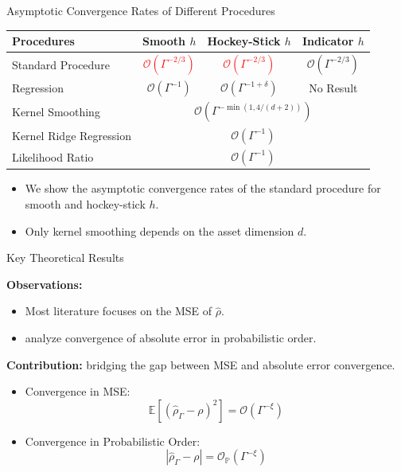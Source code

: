 \documentclass[9pt,handout]{beamer}
\begin{document}
\begin{frame}{Asymptotic Convergence Rates of Different Procedures}

    \begin{table}
		\centering
		\begin{tabular}{l|c|c|c}
			\toprule
			\textbf{Procedures} & \textbf{Smooth $h$} & \textbf{Hockey-Stick $h$} & \textbf{Indicator $h$}  \\
			\midrule
			Standard Procedure	& \textcolor{red}{$\mathcal{O}(\Gamma^{-2/3})$} & \textcolor{red}{$\mathcal{O}(\Gamma^{-2/3})$} & $\mathcal{O}(\Gamma^{-2/3})$ \\
			\midrule
			Regression  & $\mathcal{O}(\Gamma^{-1})$ & $\mathcal{O}(\Gamma^{-1+\delta})$ & No Result \\
			\midrule
			Kernel Smoothing 	& \multicolumn{3}{c}{$\mathcal{O}(\Gamma^{-\min(1, 4/(d+2))})$}  \\
			\midrule
			Kernel Ridge Regression  		& \multicolumn{3}{c}{$\mathcal{O}(\Gamma^{-1})$} \\
			\midrule
			Likelihood Ratio  			& \multicolumn{3}{c}{$\mathcal{O}(\Gamma^{-1})$} \\
			\bottomrule
		\end{tabular}
	\end{table}
    \vspace{10pt}
    \begin{itemize}
        \item We show the asymptotic convergence rates of the standard procedure for smooth and hockey-stick $h$.
        \item Only kernel smoothing depends on the asset dimension $d$.
    \end{itemize}

\note{}
    
\end{frame}

\begin{frame}{Key Theoretical Results}

\textbf{Observations:}
\begin{itemize}
\item Most literature focuses on the MSE of $\hat{\rho}$.
\item \citet{wang2022smooth} analyze convergence of absolute error in probabilistic order.
\end{itemize}

\vspace{10pt}

\textbf{Contribution:} bridging the gap between MSE and absolute error convergence.
\begin{itemize}
    \item Convergence in MSE:
    $$ \mathbb{E} \left[ \left( \hat{\rho}_{\Gamma} - \rho \right)^2 \right] = \mathcal{O} \left( \Gamma^{-\xi} \right) $$
    \item Convergence in Probabilistic Order:
    $$ |\hat{\rho}_{\Gamma} - \rho| = \mathcal{O}_{\mathbb{P}}(\Gamma^{-\xi}) $$
\end{itemize}

\end{frame}
\end{document}
